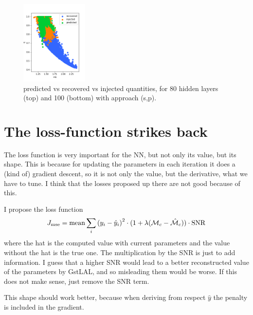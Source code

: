 \documentclass[prd,aps,twocolumn,a4paper,showkeys,nofootinbib]{article}
\begin{document}
\begin{figure}[]
  \includegraphics[width=0.3\textwidth]{./Figs/100_q}
  \caption{\label{fig:approach3_comparison3} predicted vs recovered vs injected quantities, for 80 hidden layers (top) and 100 (bottom) with approach (s,p).}
\end{figure}

\section{The loss-function strikes back}
\label{sec:loss_new}
The loss function is very important for the NN, but not only its value, but its shape. This is because for updating the parameters in each iteration it does a (kind of) gradient descent, so it is not only the value, but the derivative, what we have to tune. I think that the losses proposed up there are not good because of this.

I propose the loss function 
\begin{equation}
J_{\rm mse} = {\rm mean} \sum_i \left( y_i - \hat{y}_i \right)^2 \cdot(1+\lambda(\mathcal{M}_c-\hat{\mathcal{M}}_c))\cdot \rm{SNR}
\end{equation}
where the hat is the computed value with current parameters and the value without the hat is the true one. The multiplication by the SNR is just to add information. I guess that a higher SNR would lead to a better reconstructed value of the parameters by GstLAL, and so misleading them would be worse. If this does not make sense, just remove the SNR term.

This shape should work better, because when deriving from respect $\hat{y}$ the penalty is included in the gradient.

\end{document}
